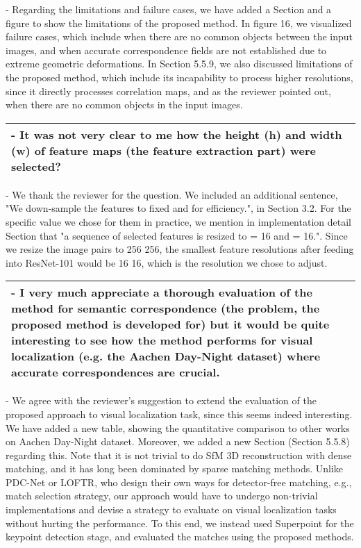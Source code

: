 \documentclass[11pt,draftclsnofoot,onecolumn]{IEEEtran}
\begin{document}
- Regarding the limitations and failure cases, we have added a Section and a figure to show the limitations of the proposed method. In figure 16, we visualized failure cases, which include when there are no common objects between the input images, and when accurate correspondence fields are not established due to extreme geometric deformations. In Section 5.5.9, we also discussed limitations of the proposed method, which include its incapability to process higher resolutions, since it directly processes correlation maps, and as the reviewer pointed out, when there are no common objects in the input images. 


\newpage


\begin{longtable}{|p{16cm}|}
	\hline 
	\textbf{
	- It was not very clear to me how the height (h) and width (w) of feature maps (the feature extraction part) were selected?  }\\

	\hline
\end{longtable}

- We thank the reviewer for the question. We included an additional sentence, "We down-sample the features to fixed  and  for efficiency.", in Section 3.2. For the specific value we chose for them in practice, we mention in implementation detail Section that "a sequence of selected features is resized to  = 16 and  = 16.". Since we resize the image pairs to 256  256, the smallest feature resolutions after feeding into ResNet-101 would be 16  16, which is the resolution we chose to adjust.

\newpage

	
\begin{longtable}{|p{16cm}|}
	\hline 
	\textbf{
	- I very much appreciate a thorough evaluation of the method for semantic correspondence (the problem, the proposed method is developed for) but it would be quite interesting to see how the method performs for visual localization (e.g. the Aachen Day-Night dataset) where accurate correspondences are crucial.  }\\
	\hline
\end{longtable}


- We agree with the reviewer's suggestion to extend the evaluation of the proposed approach to visual localization task, since this seems indeed interesting. We have added a new table, showing the quantitative comparison to other works on Aachen Day-Night dataset. Moreover, we added a new Section (Section 5.5.8) regarding this. Note that it is not trivial to do SfM 3D reconstruction with dense matching, and it has long been dominated by sparse matching methods. Unlike PDC-Net or LOFTR, who design their own ways for detector-free matching, e.g., match selection strategy, our approach would have to undergo non-trivial implementations and devise a strategy to evaluate on visual localization tasks without hurting the performance. To this end, we instead used Superpoint for the keypoint detection stage, and evaluated the matches using the proposed methods. 
\end{document}
